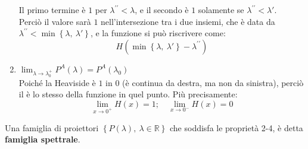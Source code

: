 \documentclass[../../FisicaTeorica.tex]{subfiles}
\begin{document}
\begin{enumerate}
\[	\]
	Il primo termine è $1$ per $\lambda^{\prime\prime}<\lambda$, e il secondo è $1$ solamente se $\lambda^{\prime\prime}<\lambda'$.\\
	Perciò il valore sarà $1$ nell'intersezione tra i due insiemi, che è data da $\lambda^{\prime\prime}<\min{\left\{\lambda,\ \lambda'\right\}}$, e la funzione si può riscrivere come:
	\[
	H\left(\min{\left\{\lambda,\ \lambda '\right\}}-\lambda^{\prime\prime}\right)
	\]
	\item $\displaystyle \lim_{\lambda\rightarrow\lambda_0^+}{P^A\left(\lambda\right)}=P^A(\lambda_0) $\\
	Poiché la Heaviside è $1$ in $0$ (è continua da destra, ma non da sinistra), perciò il  è lo stesso della funzione in quel punto. Più precisamente:
	\[
	\lim_{x\rightarrow 0^+}{H \left(x\right)}=1; \quad 
	\lim_{x\rightarrow 0^-}{H\left(x\right)}=0
	\]
\end{enumerate}
\begin{dfn}
Una famiglia di proiettori $\left\{P\left(\lambda\right),\ \lambda\in\mathbb{R}\right\}$ che soddisfa le proprietà 2-4, è detta \textbf{famiglia spettrale}.
\end{dfn}
\end{document}
